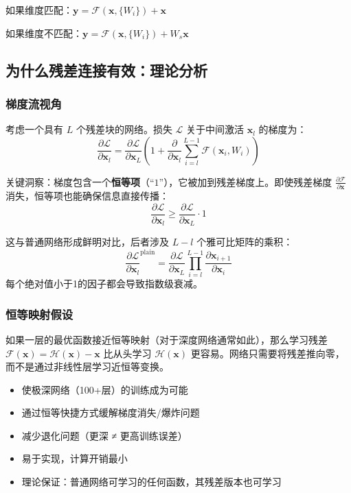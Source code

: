 如果维度匹配：$\mathbf{y} = \mathcal{F}(\mathbf{x}, \{W_i\}) + \mathbf{x}$

如果维度不匹配：$\mathbf{y} = \mathcal{F}(\mathbf{x}, \{W_i\}) + W_s\mathbf{x}$

\subsection{为什么残差连接有效：理论分析}

\subsubsection{梯度流视角}

考虑一个具有 $L$ 个残差块的网络。损失 $\mathcal{L}$ 关于中间激活 $\mathbf{x}_l$ 的梯度为：
\begin{equation}
\frac{\partial \mathcal{L}}{\partial \mathbf{x}_l} = \frac{\partial \mathcal{L}}{\partial \mathbf{x}_L} \left(1 + \frac{\partial}{\partial \mathbf{x}_l}\sum_{i=l}^{L-1} \mathcal{F}(\mathbf{x}_i, W_i)\right)
\end{equation}

关键洞察：梯度包含一个\textbf{恒等项}（``$1$''），它被加到残差梯度上。即使残差梯度 $\frac{\partial \mathcal{F}}{\partial \mathbf{x}}$ 消失，恒等项也能确保信息直接传播：
\begin{equation}
\frac{\partial \mathcal{L}}{\partial \mathbf{x}_l} \geq \frac{\partial \mathcal{L}}{\partial \mathbf{x}_L} \cdot 1
\end{equation}

这与普通网络形成鲜明对比，后者涉及 $L - l$ 个雅可比矩阵的乘积：
\begin{equation}
\frac{\partial \mathcal{L}}{\partial \mathbf{x}_l}^{\text{plain}} = \frac{\partial \mathcal{L}}{\partial \mathbf{x}_L} \prod_{i=l}^{L-1} \frac{\partial \mathbf{x}_{i+1}}{\partial \mathbf{x}_i}
\end{equation}
每个绝对值小于1的因子都会导致指数级衰减。

\subsubsection{恒等映射假设}

如果一层的最优函数接近恒等映射（对于深度网络通常如此），那么学习残差 $\mathcal{F}(\mathbf{x}) = \mathcal{H}(\mathbf{x}) - \mathbf{x}$ 比从头学习 $\mathcal{H}(\mathbf{x})$ 更容易。网络只需要将残差推向零，而不是通过非线性层学习近恒等变换。

\begin{properties}
\begin{itemize}
    \item 使极深网络（100+层）的训练成为可能
    \item 通过恒等快捷方式缓解梯度消失/爆炸问题
    \item 减少退化问题（更深 ≠ 更高训练误差）
    \item 易于实现，计算开销最小
    \item 理论保证：普通网络可学习的任何函数，其残差版本也可学习
\end{itemize}
\end{properties}

